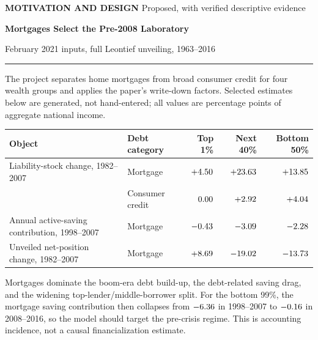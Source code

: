 \clearpage
{\color{MSSOrange}\bfseries\small MOTIVATION AND DESIGN}\hfill
{\color{MSSGray}\small Proposed, with verified descriptive evidence}\par
{\color{MSSNavy}\bfseries\LARGE Mortgages Select the Pre-2008 Laboratory}\par
{\color{MSSGray}\small February 2021 inputs, full Leontief unveiling, 1963--2016}
\vspace{0.24em}\hrule height 1.1pt\vspace{0.32em}

The project separates home mortgages from broad consumer credit for four
wealth groups and applies the paper's write-down factors. Selected estimates
below are generated, not hand-entered; all values are percentage points of
aggregate national income.

\begin{tabularx}{\textwidth}{@{}X L{1.15in}rrr@{}}
\toprule
\textbf{Object} & \textbf{Debt category} &
\textbf{Top 1\%} & \textbf{Next 40\%} & \textbf{Bottom 50\%} \\
\midrule
Liability-stock change, 1982--2007
& Mortgage
& $+4.50$
& $+23.63$
& $+13.85$ \\
& Consumer credit
& $0.00$
& $+2.92$
& $+4.04$ \\
\addlinespace
Annual active-saving contribution, 1998--2007
& Mortgage
& $-0.43$
& $-3.09$
& $-2.28$ \\
\addlinespace
Unveiled net-position change, 1982--2007
& Mortgage
& $+8.69$
& $-19.02$
& $-13.73$ \\
\bottomrule
\end{tabularx}

Mortgages dominate the boom-era debt build-up, the debt-related saving drag,
and the widening top-lender/middle-borrower split. For the bottom 99\%, the
mortgage saving contribution then collapses from
$-6.36$ in 1998--2007 to
$-0.16$ in 2008--2016, so the model should
target the pre-crisis regime. This is accounting incidence, not a causal
financialization estimate.


